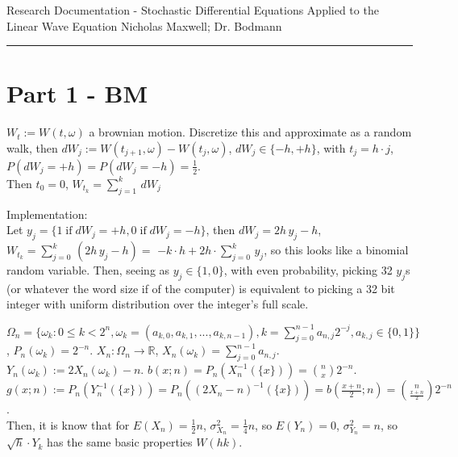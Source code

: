 \documentclass[12pt]{article}
\newcommand{\reals}[0] { \mathbb{R}}
\newcommand{\IF}[0] { \; \textrm{if} \; }
\begin{document}
\begin{flushleft}
Research Documentation - Stochastic Differential Equations Applied to the Linear Wave Equation
Nicholas Maxwell; Dr. Bodmann\\
\end{flushleft}

\begin{flushleft}
\addvspace{5pt} \hrule
\end{flushleft}	



\section*{Part 1 - BM}

\begin{flushleft}
$W_t := W(t,\omega)$ a brownian motion. Discretize this and approximate as a random walk, then $dW_j := W(t_{j+1},\omega)-W(t_{j},\omega)$, $dW_j \in \{-h, +h\}$, with $t_j = h \cdot j$, $P(dW_j = +h) = P(dW_j = -h) = \frac{1}{2}$. \\
Then $t_0 = 0$, $W_{t_k} = \sum_{j=1}^{k} \, dW_j$
\end{flushleft}

\begin{flushleft}
Implementation:\\
Let $y_j = \{ 1 \IF dW_j = +h, 0 \IF dW_j = -h \}$, then $dW_j = 2h\, y_j-h$, $W_{t_k} = \sum_{j=0}^{k} \, (2h\, y_j-h) =$ $ -k \cdot h + 2h \cdot \sum_{j=0}^{k} \, y_j$, so this looks like a binomial random variable. Then, seeing as $y_j \in \{ 1,0\}$, with even probability, picking 32 $y_j$s (or whatever the word size if of the computer) is equivalent to picking a 32 bit integer with uniform distribution over the integer's full scale. 
\end{flushleft}

\begin{flushleft}
$\Omega_n = \{ \omega_k: 0 \le k < 2^n, \omega_k = (a_{k,0}, a_{k,1}, ... ,a_{k,n-1}), k = \sum_{j=0}^{n-1} a_{n,j} 2^{-j}, a_{k,j} \in \{ 0,1 \} \}$, $P_n(\omega_k) = 2^{-n}$. $X_n: \Omega_n \rightarrow \reals$, $X_n(\omega_k) = \sum_{j=0}^{n-1} a_{n,j} $. $Y_n(\omega_k) := 2 X_n(\omega_k) - n$. $b(x; n) = P_n ( X_n^{-1}( \{ x \}) ) = \binom{n}{x} 2^{-n} $. $g(x; n) := P_n ( Y_n^{-1}( \{ x \}) ) = P_n ( (2 X_n - n)^{-1}( \{ x \}) ) =  b(\frac{x+n}{2}; n) = \binom{n}{\frac{x+n}{2}} 2^{-n} $. \\ 
Then, it is know that for $E(X_n) = \frac{1}{2} n $, $\sigma_{X_n}^2 = \frac{1}{4} n$, so $E(Y_n) = 0$, $\sigma_{Y_n}^2 = n$, so $\sqrt{h} \cdot Y_k$ has the same basic properties $W(h k)$.
\end{flushleft}
\end{document}
